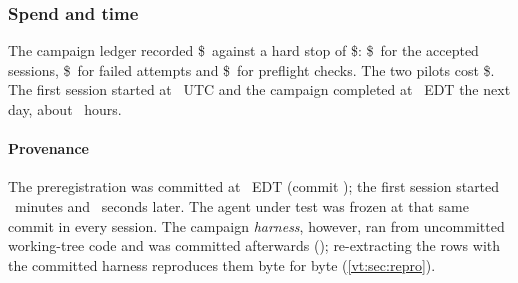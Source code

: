 \subsubsection{Spend and time}

The campaign ledger recorded \$\SpendLedger\ against a hard stop of \$\SpendBudget: \$\SpendSessions\ for
the accepted sessions, \$\NFailedUSD\ for failed attempts and \$\SpendPreflight\ for preflight checks. The
two pilots cost \$\SpendPilots. The first session started at \FirstStart\ UTC and the campaign completed at
\CompleteEDT\ EDT the next day, about \WallHours\ hours.

\paragraph{Provenance} The preregistration was committed at \PreregTime\ EDT (commit \code{\PreregSha});
the first session started \PreregGapMin\ minutes and \PreregGapSec\ seconds later. The agent under test was
frozen at that same commit in every session. The campaign \emph{harness}, however, ran from uncommitted
working-tree code and was committed afterwards (\code{\HarnessSha}); re-extracting the rows with the
committed harness reproduces them byte for byte (\cref{vt:sec:repro}).
